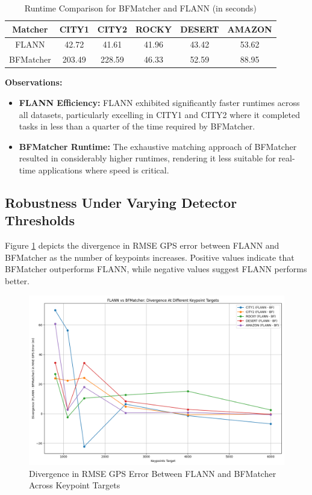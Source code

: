 \begin{itemize}
\begin{table}[H]
    \centering
    \caption{Runtime Comparison for BFMatcher and FLANN (in seconds)}
    \label{tab:flann_bf_comparison_runtime}
    \begin{tabular}{|c|c|c|c|c|c|}
    \hline
    \textbf{Matcher} & \textbf{CITY1} & \textbf{CITY2} & \textbf{ROCKY} & \textbf{DESERT} & \textbf{AMAZON} \\ \hline
    FLANN          & 42.72           & 41.61          & 41.96          & 43.42           & 53.62           \\ \hline
    BFMatcher      & 203.49          & 228.59         & 46.33          & 52.59           & 88.95           \\ \hline
    \end{tabular}
\end{table}

\textbf{Observations:}
\begin{itemize}
    \item \textbf{FLANN Efficiency:} FLANN exhibited significantly faster runtimes across all datasets, particularly excelling in CITY1 and CITY2 where it completed tasks in less than a quarter of the time required by BFMatcher.
    \item \textbf{BFMatcher Runtime:} The exhaustive matching approach of BFMatcher resulted in considerably higher runtimes, rendering it less suitable for real-time applications where speed is critical.
\end{itemize}

\subsection{Robustness Under Varying Detector Thresholds}

Figure \ref{fig:divergence_plot} depicts the divergence in RMSE GPS error between FLANN and BFMatcher as the number of keypoints increases. Positive values indicate that BFMatcher outperforms FLANN, while negative values suggest FLANN performs better.

\begin{figure}[H]
    \centering
    \includegraphics[width=\textwidth]{./Graphs/Divergence_BF_FLANN_KPS.png}
    \caption{Divergence in RMSE GPS Error Between FLANN and BFMatcher Across Keypoint Targets}
    \label{fig:divergence_plot}
\end{figure}


\end{itemize}
